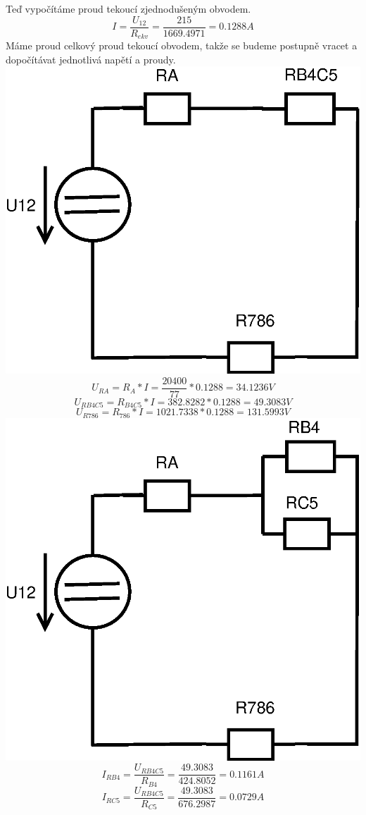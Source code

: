 \documentclass[a4paper, 12pt]{article}
\begin{document}
Teď vypočítáme proud tekoucí zjednodušeným obvodem.
$$ I = \frac{U_{12}}{R_{ekv}} = \frac{215}{1669.4971} = 0.1288 A$$
\vspace{1mm}
Máme proud celkový proud tekoucí obvodem, takže se budeme postupně vracet a dopočítávat jednotlivá napětí a proudy.
\includegraphics[scale=0.4]{pr1/Diagram4.eps}
\vspace{1mm}
$$ U_{RA} = R_A * I = \frac{20400}{77} * 0.1288 = 34.1236V $$
\vspace{1mm}
$$ U_{RB4C5} = R_{B4C5} * I = 382.8282 * 0.1288 = 49.3083V $$
\vspace{1mm}
$$ U_{R786} = R_{786} * I = 1021.7338 * 0.1288 = 131.5993 V $$
\vspace{1mm}
\includegraphics[scale=0.4]{pr1/Diagram3.eps}
\vspace{1mm}
$$ I_{RB4} = \frac{U_{RB4C5}}{R_{B4}} = \frac{49.3083}{424.8052} = 0.1161 A $$
\vspace{1mm}
$$ I_{RC5} = \frac{U_{RB4C5}}{R_{C5}} = \frac{49.3083}{676.2987} = 0.0729 A $$
\vspace{1mm}
\end{document}
